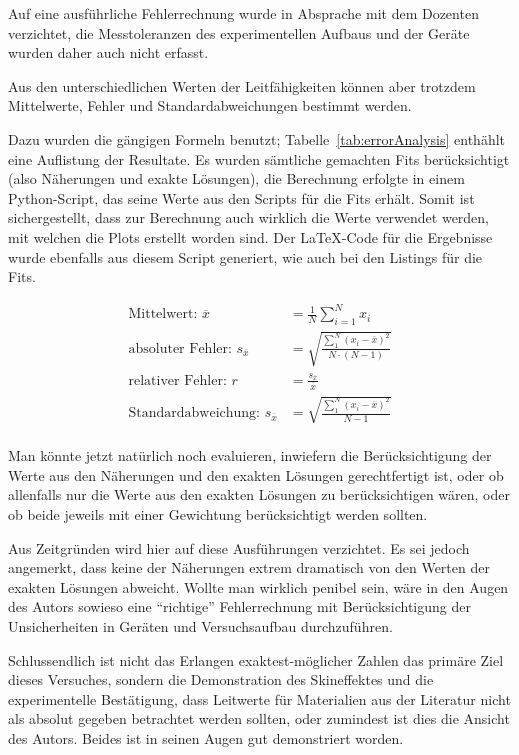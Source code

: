 Auf eine  ausf\"uhrliche Fehlerrechnung  wurde in  Absprache mit  dem Dozenten
verzichtet, die  Messtoleranzen des  experimentellen Aufbaus und  der Ger\"ate
wurden daher auch nicht erfasst.

Aus den unterschiedlichen Werten  der Leitf\"ahigkeiten k\"onnen aber trotzdem
Mittelwerte, Fehler und Standardabweichungen bestimmt werden.

Dazu  wurden die  g\"angigen Formeln  benutzt; Tabelle~\ref{tab:errorAnalysis}
enth\"ahlt eine Auflistung der Resultate. Es wurden s\"amtliche gemachten Fits
ber\"ucksichtigt  (also N\"aherungen  und exakte  L\"osungen), die  Berechnung
erfolgte in  einem Python-Script, das  seine Werte  aus den Scripts  f\"ur die
Fits erh\"alt.  Somit  ist sichergestellt,  dass zur Berechnung  auch wirklich
die Werte  verwendet werden, mit  welchen die Plots erstellt  worden sind. Der
\LaTeX-Code f\"ur die Ergebnisse wurde  ebenfalls aus diesem Script generiert,
wie auch bei den Listings f\"ur die Fits.

\begin{align*}
    \text{Mittelwert:~}             \overline{x} & = \frac{1}{N} \sum_{i=1}^{N}{x_i} \\
    \text{absoluter Fehler:~}   s_{\overline{x}} & = \sqrt{ \frac{\sum_{1}^{N}{(x_i-\overline{x})^2}}{N \cdot (N-1)}} \\
    \text{relativer Fehler:~}   r                & = \frac{s_{\overline{x}}}{\overline{x}} \\
    \text{Standardabweichung:~} s_{\overline{x}} & = \sqrt{ \frac{\sum_{1}^{N}{(x_i-\overline{x})^2}}{N-1}} \\
\end{align*}



Man   k\"onnte    jetzt   nat\"urlich    noch   evaluieren,    inwiefern   die
Ber\"ucksichtigung der Werte  aus den N\"aherungen und  den exakten L\"osungen
gerechtfertigt  ist,  oder  ob  allenfalls  nur  die  Werte  aus  den  exakten
L\"osungen  zu ber\"ucksichtigen  w\"aren,  oder ob  beide  jeweils mit  einer
Gewichtung  ber\"ucksichtigt  werden   sollten.

Aus  Zeitgr\"unden  wird  hier  auf diese  Ausf\"uhrungen  verzichtet. Es  sei
jedoch  angemerkt,  dass keine  der  N\"aherungen  extrem dramatisch  von  den
Werten  der exakten  L\"osungen  abweicht. Wollte man  wirklich penibel  sein,
w\"are  in  den Augen  des  Autors  sowieso eine  ``richtige''  Fehlerrechnung
mit  Ber\"ucksichtigung der  Unsicherheiten  in  Ger\"aten und  Versuchsaufbau
durchzuf\"uhren.

Schlussendlich  ist   nicht  das  Erlangen  exaktest-m\"oglicher   Zahlen  das
prim\"are Ziel  dieses Versuches,  sondern die Demonstration  des Skineffektes
und die experimentelle Best\"atigung, dass Leitwerte f\"ur Materialien aus der
Literatur nicht als absolut gegeben  betrachtet werden sollten, oder zumindest
ist dies die  Ansicht des Autors. Beides ist in seinen  Augen gut demonstriert
worden.
